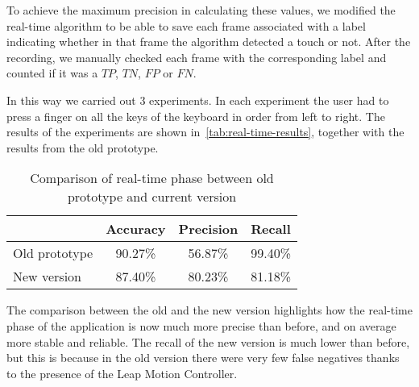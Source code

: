 To achieve the maximum precision in calculating these values, we modified the real-time algorithm to be able to save
each frame associated with a label indicating whether in that frame the algorithm detected a touch or not.
After the recording, we manually checked each frame with the corresponding label and counted if it was a $TP$, $TN$, $FP$ or $FN$.

In this way we carried out 3 experiments.
In each experiment the user had to press a finger on all the keys of the keyboard in order from left to right.
The results of the experiments are shown in~\autoref{tab:real-time-results},
together with the results from the old prototype.

\begin{table}[ht]
	\centering
	\begin{tabular}{l|l|l|l|}
		\cline{2-4}
		& Accuracy                      & Precision                     & Recall                        \\ \hline
		\multicolumn{1}{|l|}{Old prototype} & \multicolumn{1}{|c|}{90.27\%} & \multicolumn{1}{|c|}{56.87\%}   & \multicolumn{1}{|c|}{99.40\%} \\ \hline
		\multicolumn{1}{|l|}{New version}   & \multicolumn{1}{|c|}{87.40\%} & \multicolumn{1}{|c|}{80.23\%}   & \multicolumn{1}{|c|}{81.18\%} \\ \hline
	\end{tabular}
	\caption{Comparison of real-time phase between old prototype and current version}
	\label{tab:real-time-results}
\end{table}

The comparison between the old and the new version highlights how the real-time phase of the application is now much
more precise than before, and on average more stable and reliable.
The recall of the new version is much lower than before, but this is because in the old version there were very few
false negatives thanks to the presence of the Leap Motion Controller.
